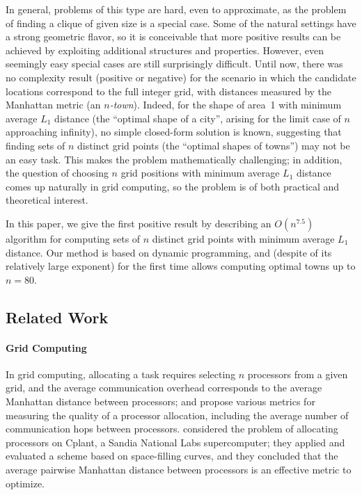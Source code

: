\documentclass[preprint,authoryear,12pt]{elsarticle}
\begin{document}
In general, problems of this type are hard, even
to approximate, as the problem of finding a clique of given size is a special case. Some of the
natural settings have a strong geometric flavor, so it is conceivable
that more positive results can be achieved by exploiting additional
structures and properties.
However, even seemingly easy
special cases are still surprisingly difficult. Until now, there was no
complexity result (positive or negative) for the scenario in which
the candidate locations correspond to the full integer grid, with distances measured
by the Manhattan metric (an \emph{$n$-town}).
Indeed, for the shape of area~1 with minimum
average $L_1$ distance (the ``optimal shape of a city'', arising
for the limit case of $n$ approaching infinity), no simple
closed-form solution is known, suggesting that finding sets of $n$ distinct
grid points (the ``optimal shapes of towns'') may not be an easy task.
This makes the problem mathematically challenging; in addition,
the question of choosing $n$ grid positions with minimum
average $L_1$ distance comes up naturally in grid computing, so
the problem is of both practical and theoretical interest.

In this paper, we give the first positive result by describing
an $O(n^{7.5})$ algorithm for computing sets of $n$ distinct grid points
with minimum average $L_1$ distance. Our method is based on dynamic programming,
and (despite of its relatively large exponent) for the first time allows computing optimal
towns up to $n=80$.

\subsection{Related Work}
\paragraph{Grid Computing}
In grid computing, allocating a task requires selecting $n$ processors from
a given grid,
and the average communication overhead corresponds to
the average Manhattan distance between processors;
\cite{mache96,mache97} and \cite{leung02}
propose various metrics for
measuring the quality of a processor allocation, including the
average number of communication hops between processors.
\cite{leung02} considered the problem of allocating processors
 on Cplant, a Sandia National Labs
supercomputer;
they applied and evaluated a scheme
based on space-filling curves, and
 they concluded that the average pairwise Manhattan
distance between processors is an effective metric to optimize.
\end{document}
